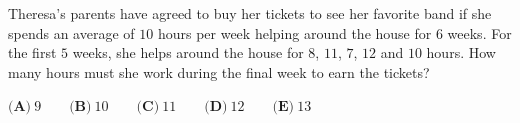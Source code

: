 Theresa's parents have agreed to buy her tickets to see her favorite band if she spends an average of $10$ hours per week helping around the house for $6$ weeks. For the first $5$ weeks, she helps around the house for $8$, $11$, $7$, $12$ and $10$ hours. How many hours must she work during the final week to earn the tickets?

$\textbf{(A)}\ 9 \qquad \textbf{(B)}\ 10 \qquad \textbf{(C)}\ 11 \qquad \textbf{(D)}\ 12 \qquad \textbf{(E)}\ 13$
